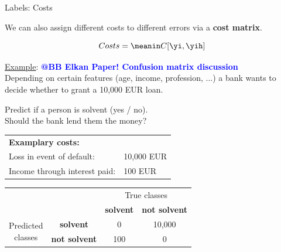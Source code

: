 \documentclass[11pt,compress,t,notes=noshow, xcolor=table]{beamer}
\begin{document}
\begin{vbframe}{Labels: Costs}

\small

We can also assign different costs to different errors via a 
\textbf{cost matrix}.

$$
  Costs = \meanin C[\yi, \yih]
$$

\underline{Example}: \textbf{\textcolor{blue}{@BB Elkan Paper! Confusion matrix discussion}}\\ 
Depending on certain features (age, income, profession, ...) a bank wants to 
decide whether to grant a 10,000 EUR loan.\\ 

\medskip

Predict if a person is solvent (yes / no).\\ 
Should the bank lend them the money?\\

\medskip
  \begin{tabular}{ll}
    \textbf{Examplary costs:} & \\
    Loss in event of default: & 10,000 EUR\\
    Income through interest paid: & 100 EUR\\
  \end{tabular}
 
\begin{table}[ht]
  \small
  \begin{tabular}{cccc}
    \hline
    & &\multicolumn{2}{c}{True classes} \\ 
    & &\textbf{solvent} & \textbf{not solvent}  \\ 
    \hline
    \multirow{2}{*}{\parbox{1cm}{Predicted \\ classes}}& \textbf{solvent}     & 0                 & 10,000\\
    & \textbf{not solvent} & 100               & 0\\
    \hline
\end{tabular}
\end{table}
 
\end{vbframe}

\end{document}
